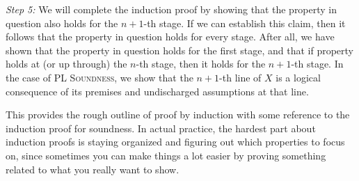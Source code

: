 \textit{Step 5:} 
We will complete the induction proof by showing that the property in question also holds for the $n+1$-th stage.
If we can establish this claim, then it follows that the property in question holds for every stage.
After all, we have shown that the property in question holds for the first stage, and that if property holds at (or up through) the $n$-th stage, then it holds for the $n+1$-th stage.
In the case of \textsc{PL Soundness}, we show that the $n+1$-th line of $X$ is a logical consequence of its premises and undischarged assumptions at that line. 



This provides the rough outline of proof by induction with some reference to the induction proof for soundness.
In actual practice, the hardest part about induction proofs is staying organized and figuring out which properties to focus on, since sometimes you can make things a lot easier by proving something related to what you really want to show.







%   








